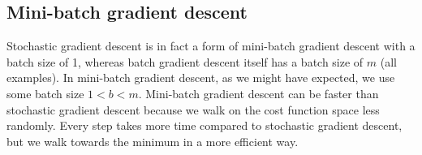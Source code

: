 \documentclass[a4paper, 10pt,hidelinks]{article}
\begin{document}
\subsection{Mini-batch gradient descent}
Stochastic gradient descent is in fact a form of mini-batch gradient descent with a batch size of 1, whereas batch gradient descent itself has a batch size of $m$ (all examples). In mini-batch gradient descent, as we might have expected, we use some batch size $1 < b < m$. Mini-batch gradient descent can be faster than stochastic gradient descent because we walk on the cost function space less randomly. 
Every step takes more time compared to stochastic gradient descent, but we walk towards the minimum in a more efficient way. 
\end{document}

